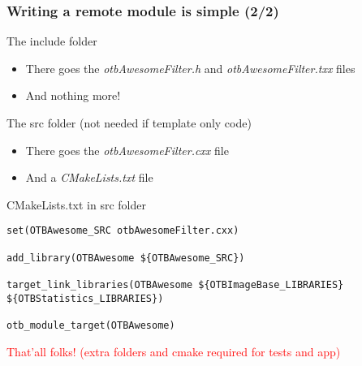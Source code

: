 \documentclass[8pt]{beamer}
\begin{document}
\begin{frame}[fragile]
\frametitle{Writing a remote module is simple (2/2)}
\begin{block}{The include folder}
\begin{itemize}
\item There goes the \textit{otbAwesomeFilter.h} and \textit{otbAwesomeFilter.txx} files
\item And nothing more!
\end{itemize}
\end{block}

\begin{block}{The src folder (not needed if template only code)}
\begin{itemize}
\item There goes the \textit{otbAwesomeFilter.cxx} file
\item And a \textit{CMakeLists.txt} file
\end{itemize}
\end{block}


\begin{block}{CMakeLists.txt in src folder}
\begin{small}
\begin{verbatim}
set(OTBAwesome_SRC otbAwesomeFilter.cxx)

add_library(OTBAwesome ${OTBAwesome_SRC})

target_link_libraries(OTBAwesome ${OTBImageBase_LIBRARIES} ${OTBStatistics_LIBRARIES})

otb_module_target(OTBAwesome)
\end{verbatim}
\end{small}
\end{block}

\textcolor{red}{That'all folks! (extra folders and cmake required for tests and app)}

\end{frame}
\end{document}
